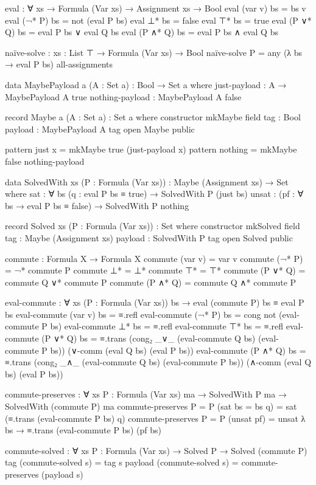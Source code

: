 \begin{code}
  eval : ∀ {xs} → Formula (Var xs) → Assignment xs → Bool
  eval (var v) bs = bs v
  eval (¬* P) bs = not (eval P bs)
  eval ⊥* bs = false
  eval ⊤* bs = true
  eval (P ∨* Q) bs = eval P bs ∨ eval Q bs
  eval (P ∧* Q) bs = eval P bs ∧ eval Q bs

  naïve-solve : {xs : List ⊤} → Formula (Var xs) → Bool
  naïve-solve P = any (λ bs → eval P bs) all-assignments

  data MaybePayload {a} (A : Set a) : Bool → Set a where
    just-payload : A → MaybePayload A true
    nothing-payload : MaybePayload A false

  record Maybe {a} (A : Set a) : Set a where
    constructor mkMaybe
    field
      tag : Bool
      payload : MaybePayload A tag
  open Maybe public

  pattern just x = mkMaybe true (just-payload x)
  pattern nothing = mkMaybe false nothing-payload

  data SolvedWith {xs} (P : Formula (Var xs))
                  : Maybe (Assignment xs) → Set where
    sat : ∀ {bs} (q : eval P bs ≡ true) → SolvedWith P (just bs)
    unsat : (pf : ∀ bs → eval P bs ≡ false) → SolvedWith P nothing

  record Solved {xs} (P : Formula (Var xs)) : Set where
    constructor mkSolved
    field
      tag : Maybe (Assignment xs)
      payload : SolvedWith P tag
  open Solved public

  commute : Formula X → Formula X
  commute (var v) = var v
  commute (¬* P) = ¬* commute P
  commute ⊥* = ⊥*
  commute ⊤* = ⊤*
  commute (P ∨* Q) = commute Q ∨* commute P
  commute (P ∧* Q) = commute Q ∧* commute P

  eval-commute : ∀ {xs} (P : Formula (Var xs)) bs →
                 eval (commute P) bs ≡ eval P bs
  eval-commute (var v) bs = ≡.refl
  eval-commute (¬* P) bs = cong not (eval-commute P bs)
  eval-commute ⊥* bs = ≡.refl
  eval-commute ⊤* bs = ≡.refl
  eval-commute (P ∨* Q) bs =
    ≡.trans (cong₂ _∨_ (eval-commute Q bs) (eval-commute P bs))
            (∨-comm (eval Q bs) (eval P bs))
  eval-commute (P ∧* Q) bs =
    ≡.trans (cong₂ _∧_ (eval-commute Q bs) (eval-commute P bs))
            (∧-comm (eval Q bs) (eval P bs))

  commute-preserves : ∀ {xs} {P : Formula (Var xs)} {ma} →
                      SolvedWith P ma → SolvedWith (commute P) ma
  commute-preserves {P = P} (sat {bs = bs} q) =
    sat (≡.trans (eval-commute P bs) q)
  commute-preserves {P = P} (unsat pf) =
    unsat λ bs → ≡.trans (eval-commute P bs) (pf bs)

  commute-solved : ∀ {xs} {P : Formula (Var xs)} →
                   Solved P → Solved (commute P)
  tag (commute-solved s) = tag s
  payload (commute-solved s) = commute-preserves (payload s)
\end{code}
